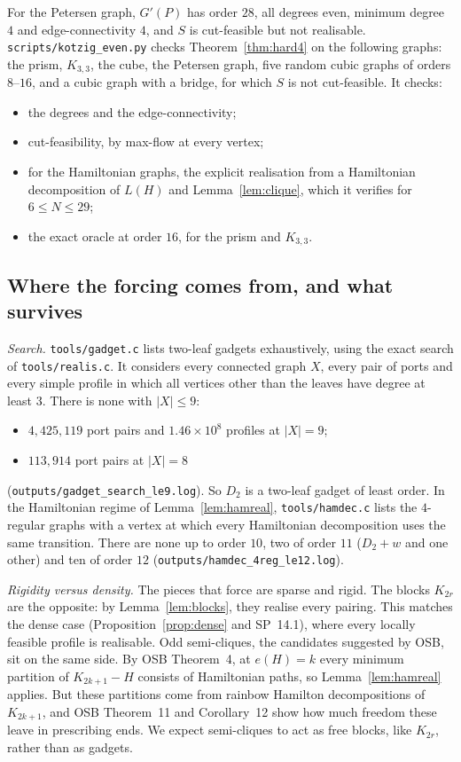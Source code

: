 \documentclass[11pt]{amsart}
\theoremstyle{definition}
\begin{document}
For the Petersen graph, $G'(P)$ has order $28$, all degrees even, minimum degree $4$ and
edge-connectivity $4$, and $S$ is cut-feasible but not realisable. \texttt{scripts/kotzig\_even.py}
checks Theorem~\ref{thm:hard4} on the following graphs: the prism, $K_{3,3}$, the cube, the Petersen
graph, five random cubic graphs of orders $8$--$16$, and a cubic graph with a bridge, for which $S$
is not cut-feasible. It checks:
\begin{itemize}
\item the degrees and the edge-connectivity;
\item cut-feasibility, by max-flow at every vertex;
\item for the Hamiltonian graphs, the explicit realisation from a Hamiltonian decomposition of $L(H)$
and Lemma~\ref{lem:clique}, which it verifies for $6\le N\le29$;
\item the exact oracle at order $16$, for the prism and $K_{3,3}$.
\end{itemize}

\subsection{Where the forcing comes from, and what survives}\label{sec:survives}

\emph{Search.} \texttt{tools/gadget.c} lists two-leaf gadgets exhaustively, using the exact search
of \texttt{tools/realis.c}. It considers every connected graph $X$, every pair of ports and every
simple profile in which all vertices other than the leaves have degree at least $3$. There is none
with $|X|\le9$:
\begin{itemize}
\item $4{,}425{,}119$ port pairs and $1.46\times10^8$ profiles at $|X|=9$;
\item $113{,}914$ port pairs at $|X|=8$
\end{itemize}
(\texttt{outputs/gadget\_search\_le9.log}). So $D_2$ is a two-leaf gadget of least order. In the
Hamiltonian regime of Lemma~\ref{lem:hamreal}, \texttt{tools/hamdec.c} lists the $4$-regular graphs
with a vertex at which every Hamiltonian decomposition uses the same transition. There are none up to
order $10$, two of order $11$ ($D_2+w$ and one other) and ten of order $12$
(\texttt{outputs/hamdec\_4reg\_le12.log}).

\emph{Rigidity versus density.} The pieces that force are sparse and rigid. The blocks $K_{2r}$ are the
opposite: by Lemma~\ref{lem:blocks}, they realise every pairing. This matches the dense case
(Proposition~\ref{prop:dense} and SP~14.1), where every locally feasible profile is realisable. Odd
semi-cliques, the candidates suggested by OSB, sit on the same side. By OSB Theorem~4, at $e(H)=k$
every minimum partition of $K_{2k+1}-H$ consists of Hamiltonian paths, so Lemma~\ref{lem:hamreal}
applies. But these partitions come from rainbow Hamilton decompositions of $K_{2k+1}$, and OSB
Theorem~11 and Corollary~12 show how much freedom these leave in prescribing ends. We expect
semi-cliques to act as free blocks, like $K_{2r}$, rather than as gadgets.
\end{document}
